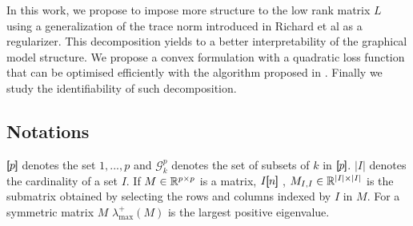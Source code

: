 In this work, we propose to impose more structure to the low rank matrix $L$ using a generalization of the trace norm introduced in Richard et al as a regularizer. This decomposition yields to a better interpretability of the graphical model structure. We propose a convex formulation with a quadratic loss function that can be optimised efficiently with the algorithm proposed in \citet{vinyes2017}.  Finally we study the identifiability of such decomposition. 

\subsection*{Notations}
$[\!\![p]\!\!]$ denotes the set ${1,...,p}$ and $\mathcal{G}^p_k$ denotes the
set of subsets of $k$ in $[\!\![p]\!\!]$. $|I|$ denotes the cardinality of a set $I$. If $M\in\mathbb{R}^{p\times p}$ is a matrix, $I[\!\![n]\!\!]$ , $M_{I,I}\in\mathbb{R}^{|I|\times |I|}$ is the submatrix obtained by selecting the rows and columns indexed by $I$ in $M$. For a symmetric matrix $M$ $\lambda_{\max}^+(M)$ is the largest positive eigenvalue.

%
